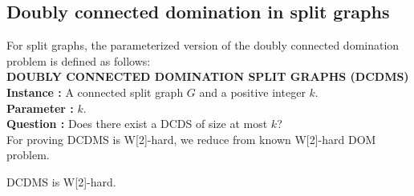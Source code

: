 \subsection{Doubly connected domination in split graphs}
\noindent 
For split graphs, the parameterized version of the doubly connected domination problem is defined as follows:\\
\textbf{DOUBLY CONNECTED DOMINATION SPLIT GRAPHS (DCDMS)}\\
\indent \textbf{Instance :} A connected split graph $G$ and a positive integer $k$.\\
\indent \textbf{Parameter :} $k$.\\
\indent \textbf{Question :} Does there exist a DCDS of size at most $k$?\\
For proving DCDMS is W[2]-hard, we reduce from known W[2]-hard DOM problem.
\begin{theorem}
DCDMS is W[2]-hard.
\end{theorem}
